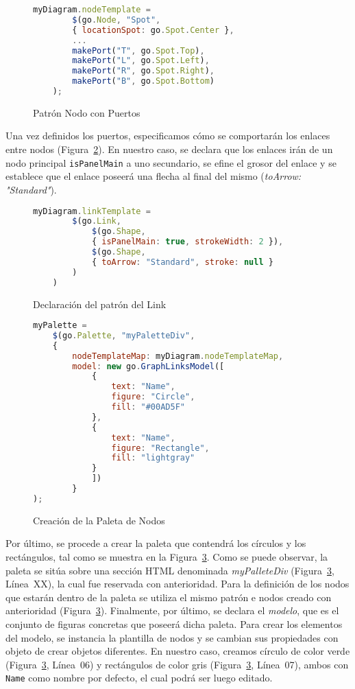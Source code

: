 \begin{figure}[!tb]
	\centering
	\begin{lstlisting}[language=JavaScript]
	myDiagram.nodeTemplate =
		$(go.Node, "Spot",
		{ locationSpot: go.Spot.Center },
        ...
		makePort("T", go.Spot.Top),
		makePort("L", go.Spot.Left),
		makePort("R", go.Spot.Right),
		makePort("B", go.Spot.Bottom)
	);\end{lstlisting}
	\caption{Patrón Nodo con Puertos}
	\label{fig:patronNodoFinal}
\end{figure}

Una vez definidos los puertos, especificamos cómo se comportarán los enlaces entre nodos (Figura~\ref{fig:patronlink}). En nuestro caso, se declara que los enlaces irán de un nodo principal \texttt{isPanelMain} a uno secundario,  se efine el grosor del enlace y se establece que el enlace poseerá una flecha al final del mismo (\emph{toArrow: "Standard"}).

\begin{figure}[!tb]
	\centering
	\begin{lstlisting}[language=JavaScript]
	myDiagram.linkTemplate =
		$(go.Link,
			$(go.Shape,
			{ isPanelMain: true, strokeWidth: 2 }),
			$(go.Shape,
			{ toArrow: "Standard", stroke: null }
		)
	)\end{lstlisting}
\caption{Declaración del patrón del Link}
\label{fig:patronlink}
\end{figure}


\begin{figure}[!tb]
	\centering
\begin{lstlisting}[language=JavaScript]
myPalette =
	$(go.Palette, "myPaletteDiv",
	{
		nodeTemplateMap: myDiagram.nodeTemplateMap,
		model: new go.GraphLinksModel([
			{ 
				text: "Name", 
				figure: "Circle", 
				fill: "#00AD5F" 
			},
			{ 
				text: "Name", 
				figure: "Rectangle", 
				fill: "lightgray" 
			}
			])
		}
);\end{lstlisting}
\caption{Creación de la Paleta de Nodos}
\label{fig:paletaNodos}
\end{figure}

Por último, se procede a crear la paleta que contendrá los círculos y los rectángulos, tal como se muestra en la Figura~\ref{fig:paletaNodos}. Como se puede observar, la paleta se sitúa sobre una sección HTML denominada \emph{myPalleteDiv} (Figura~\ref{fig:paletaNodos}, Línea~XX), la cual fue reservada con anterioridad. Para la definición de los nodos que estarán dentro de la paleta se utiliza el mismo patrón e nodos creado con anterioridad (Figura~\ref{fig:paletaNodos}). Finalmente, por último, se declara el \emph{modelo}, que es el conjunto de figuras concretas que poseerá dicha paleta. Para crear los elementos del modelo, se instancia la plantilla de nodos y se cambian sus propiedades con objeto de crear objetos diferentes. En nuestro caso, creamos círculo de color verde (Figura~\ref{fig:paletaNodos}, Línea~06) y rectángulos de color gris (Figura~\ref{fig:paletaNodos}, Línea~07), ambos con \texttt{Name} como nombre por defecto, el cual podrá ser luego editado.

